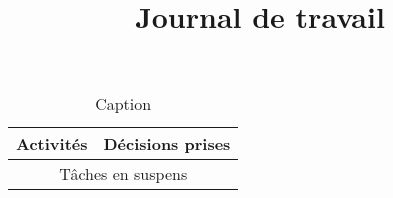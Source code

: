 \title{Journal de travail}

\paragraph{}

\begin{table}[h]
    \centering
    \setlength\tabcolsep{2mm} %
    \begin{tabular}{ |c|c| }
    
        \hline
        Activités & Décisions prises \\
        \hline
        \multicolumn{2}{|c|}{Tâches en suspens} \\
        \hline
    \end{tabular}
    \caption{Caption}
    \label{tab:my_label}
\end{table}
